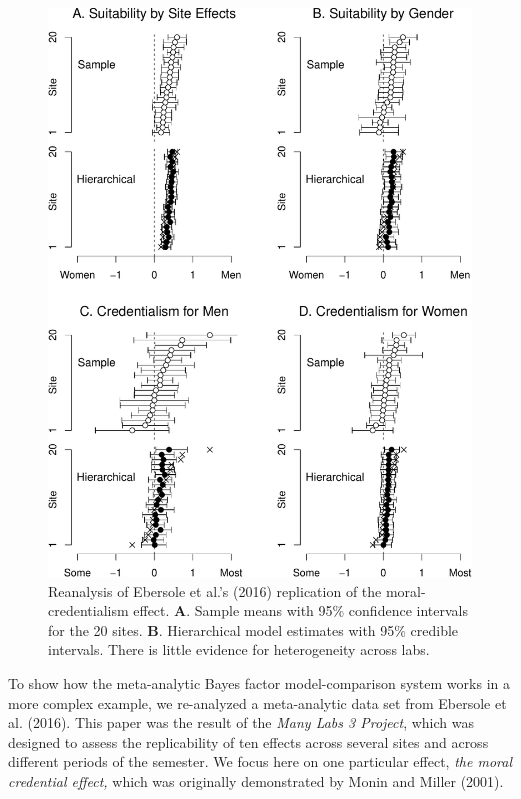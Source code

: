 \documentclass[english,man]{apa6}
\theoremstyle{definition}
\theoremstyle{definition}
\theoremstyle{definition}
\theoremstyle{remark}
\begin{document}
\begin{figure}[htbp]
\centering
\includegraphics{p_files/figure-latex/ml3Est-1.pdf}
\caption{\label{fig:ml3Est}Reanalysis of Ebersole et al.'s (2016)
replication of the moral-credentialism effect. \textbf{A}. Sample means
with 95\% confidence intervals for the 20 sites. \textbf{B}.
Hierarchical model estimates with 95\% credible intervals. There is
little evidence for heterogeneity across labs.}
\end{figure}

To show how the meta-analytic Bayes factor model-comparison system works
in a more complex example, we re-analyzed a meta-analytic data set from
Ebersole et al. (2016). This paper was the result of the \emph{Many Labs
3 Project}, which was designed to assess the replicability of ten
effects across several sites and across different periods of the
semester. We focus here on one particular effect, \emph{the moral
credential effect,} which was originally demonstrated by Monin and
Miller (2001).
\end{document}
